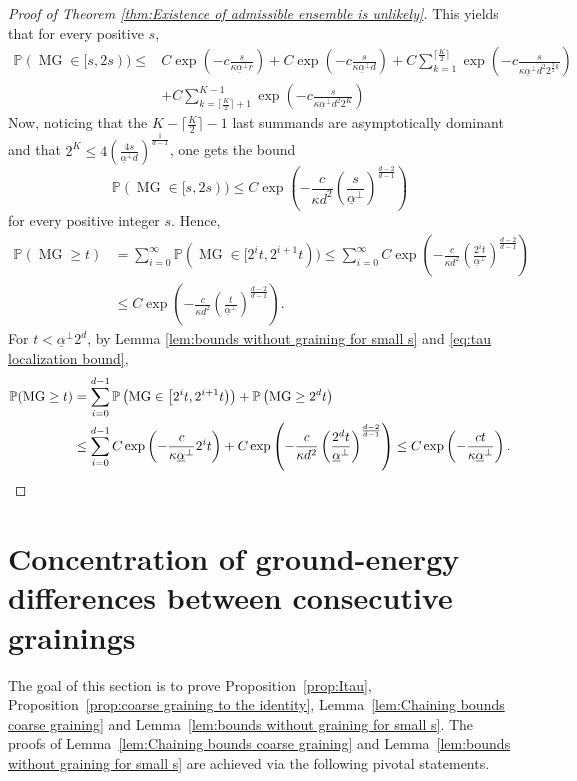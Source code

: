 \documentclass[11pt, reqno]{amsart}
\DeclareMathOperator{\MG}{MG}
\renewcommand{\P}{\mathbb{P}}
\numberwithin{equation}{section}
\begin{document}
\begin{proof}[Proof of Theorem \ref{thm:Existence of admissible ensemble is unlikely}]
This yields that for every positive $s$,
\begin{align*}
\P(\MG\in[s,2s)) \leq & C\exp\left(-c\frac{s}{\kappa \underline{\alpha}^{\perp} r}\right)+
C\exp \left(-c \frac{s}{\kappa \underline{\alpha}^{\perp} d}\right)+ 
C\sum_{k=1}^{ \lceil \frac{K}{2} \rceil } \exp \left(-c\frac{s}{\kappa \underline{\alpha}^{\perp} d^{2} 2^{\frac{3}{2} k} }\right)\\
&+C\sum_{k= \lceil \frac{K}{2} \rceil+1 }^{K-1}  \exp \left(-c\frac{s}{\kappa \underline{\alpha}^{\perp} d^{2} 2^{K} }\right)
\end{align*}
Now, noticing that the $K-\lceil \frac{K}{2} \rceil-1 $ last summands are asymptotically dominant and that $2^{K} \leq 4 \left(\frac{4s}{\underline{\alpha}^{\perp} d} \right)^{\frac{1}{d-1}}$, 
one gets the bound
\begin{equation*}
\P(\MG\in[s,2s) ) \leq C\exp \left(-\frac{c}{\kappa d^2} \left( \frac{s}{\underline{\alpha}^{\perp}} \right)^{\frac{d-2}{d-1}} \right)
\end{equation*}
for every positive integer $s$. 
Hence, 
\begin{align*}
\P(\MG\geq t )&=\sum_{i=0}^{\infty}\P(\MG\in[2^it,2^{i+1}t) ) \leq \sum_{i=0}^{\infty}C\exp \left(-\frac{c}{\kappa d^2} \left(\frac{2^i t}{\underline{\alpha}^{\perp}} \right)^{\frac{d-2}{d-1}} \right)\\
&\leq C\exp \left(-\frac{c}{\kappa  d^2} \left( \frac{t}{\underline{\alpha}^{\perp}}\right)^{\frac{d-2}{d-1}} \right).
\end{align*}
For 
$t < \underline{\alpha}^{\perp} 2^d$, 
by Lemma \ref{lem:bounds without graining for small s} and \eqref{eq:tau localization bound}, 
\begin{align*}
\P(\MG \geq t)&= \sum_{i=0}^{d-1} \P\left(\MG \in\left[2^{i}t,2^{i+1}t \right) \right)+ \P\left(\MG \geq 2^d t\right) \\
&\leq \sum_{i=0}^{d-1} C\exp\left(-\frac{c}{\kappa \underline{\alpha}^{\perp}} 2^{i} t \right)+ C\exp \left( -\frac{c}{\kappa d^2} \left( \frac{2^d t}{\underline{\alpha}^{\perp}} \right)^{\frac{d-2}{d-1}} \right)
\leq C\exp\left(-\frac{c t}{\kappa\underline{\alpha}^{\perp}}\right).
\qedhere\end{align*}
\end{proof}

\section{Concentration of ground-energy differences between consecutive grainings}
\label{sec:Concentration of ground-energy differences between consecutive grainings}
The goal of this section is to prove Proposition~\ref{prop:Itau}, Proposition~\ref{prop:coarse graining to the identity}, Lemma~\ref{lem:Chaining bounds coarse graining} and Lemma~\ref{lem:bounds without graining for small s}. 
The proofs of Lemma~\ref{lem:Chaining bounds coarse graining} and Lemma~\ref{lem:bounds without graining for small s} are achieved via the following pivotal statements.
\end{document}

